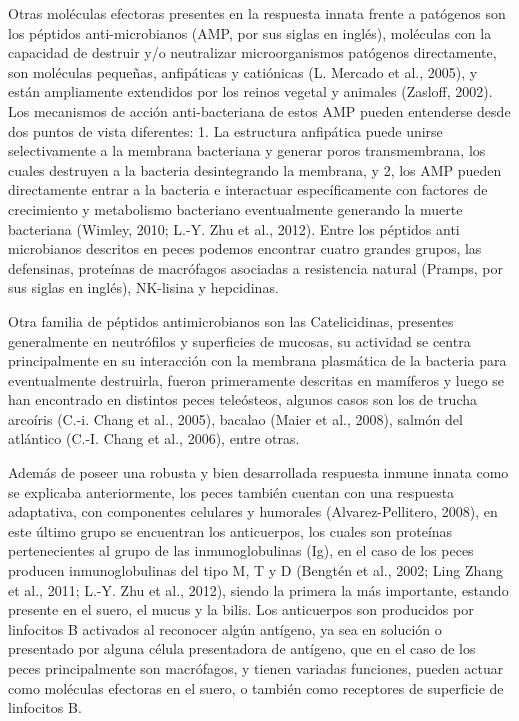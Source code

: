 \documentclass[12pt,a4paper,oneside]{scrbook}
\begin{document}
Otras moléculas efectoras presentes en la respuesta innata frente a
patógenos son los péptidos anti-microbianos (AMP, por sus siglas en
inglés), moléculas con la capacidad de destruir y/o neutralizar
microorganismos patógenos directamente, son moléculas pequeñas,
anfipáticas y catiónicas (L. Mercado et al., 2005)⁠, y están ampliamente
extendidos por los reinos vegetal y animales (Zasloff, 2002). Los
mecanismos de acción anti-bacteriana de estos AMP pueden entenderse
desde dos puntos de vista diferentes: 1. La estructura anfipática puede
unirse selectivamente a la membrana bacteriana y generar poros
transmembrana, los cuales destruyen a la bacteria desintegrando la
membrana, y 2, los AMP pueden directamente entrar a la bacteria e
interactuar específicamente con factores de crecimiento y metabolismo
bacteriano eventualmente generando la muerte bacteriana (Wimley, 2010;
L.-Y. Zhu et al., 2012)⁠. Entre los péptidos anti microbianos descritos
en peces podemos encontrar cuatro grandes grupos, las defensinas,
proteínas de macrófagos asociadas a resistencia natural (Pramps, por sus
siglas en inglés), NK-lisina y hepcidinas.

Otra familia de péptidos antimicrobianos son las Catelicidinas,
presentes generalmente en neutrófilos y superficies de mucosas, su
actividad se centra principalmente en su interacción con la membrana
plasmática de la bacteria para eventualmente destruirla, fueron
primeramente descritas en mamíferos y luego se han encontrado en
distintos peces teleósteos, algunos casos son los de trucha arcoíris
(C.-i. Chang et al., 2005)⁠, bacalao (Maier et al., 2008), salmón del
atlántico (C.-I. Chang et al., 2006), entre otras.

Además de poseer una robusta y bien desarrollada respuesta inmune innata
como se explicaba anteriormente, los peces también cuentan con una
respuesta adaptativa, con componentes celulares y humorales
(Alvarez-Pellitero, 2008)⁠, en este último grupo se encuentran los
anticuerpos, los cuales son proteínas pertenecientes al grupo de las
inmunoglobulinas (Ig), en el caso de los peces producen inmunoglobulinas
del tipo M, T y D (Bengtén et al., 2002; Ling Zhang et al., 2011; L.-Y.
Zhu et al., 2012)⁠, siendo la primera la más importante, estando
presente en el suero, el mucus y la bilis. Los anticuerpos son
producidos por linfocitos B activados al reconocer algún antígeno, ya
sea en solución o presentado por alguna célula presentadora de antígeno,
que en el caso de los peces principalmente son macrófagos, y tienen
variadas funciones, pueden actuar como moléculas efectoras en el suero,
o también como receptores de superficie de linfocitos B.
\end{document}
